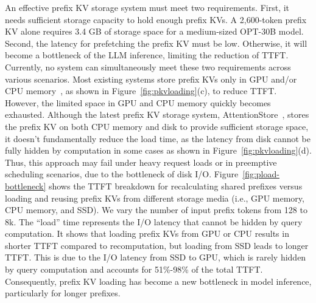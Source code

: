 An effective prefix KV storage system must meet two requirements. First, it needs sufficient storage capacity to hold enough prefix KVs. A 2,600-token prefix KV alone requires 3.4 GB of storage space for a medium-sized OPT-30B model. Second, the latency for prefetching the prefix KV must be low. Otherwise, it will become a bottleneck of the LLM inference, limiting the reduction of TTFT. 
Currently, no system can simultaneously meet these two requirements across various scenarios.
Most existing systems store prefix KVs only in GPU and/or CPU
memory~\cite{promptcache-mlsys24, sglang-arxiv23, ragcache-arxiv24,
chunkattention-arxiv24}, as shown in Figure~\ref{fig:pkvloading}(c), to reduce
TTFT. However, the limited space in GPU and CPU memory quickly becomes
exhausted. Although the latest prefix KV storage system,
AttentionStore~\cite{attentionstore-atc24}, stores the prefix KV on both CPU
memory and disk to provide sufficient storage space, it doesn’t fundamentally
reduce the load time, as the latency from disk cannot be fully hidden by
computation in some cases as shown in Figure~\ref{fig:pkvloading}(d).  
Thus, this approach may fail under heavy request loads or in preemptive scheduling scenarios, due to the bottleneck of disk I/O.
Figure~\ref{fig:pload-bottleneck} shows the TTFT breakdown for recalculating
shared prefixes versus loading and reusing prefix KVs from different storage
media (i.e., GPU memory, CPU memory, and SSD). We vary the number of input prefix tokens from
128 to 8k. The ``load''  time represents the I/O latency that cannot be hidden by
query computation. 
It shows that loading prefix KVs from GPU or CPU results in shorter TTFT compared to recomputation, but loading from SSD leads to longer TTFT. This is due to the I/O latency from SSD to GPU, which is rarely hidden by query computation and accounts for 51\%-98\% of the total TTFT.
Consequently, prefix KV loading has become a new bottleneck in model inference, particularly for longer prefixes.
